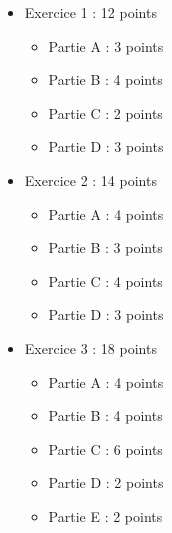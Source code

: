 \documentclass[11pt,a4paper]{article}
\begin{document}
\begin{itemize}[leftmargin=1.8em]
    \item Exercice 1 : 12 points
    \begin{itemize}
        \item Partie A : 3 points
        \item Partie B : 4 points
        \item Partie C : 2 points
        \item Partie D : 3 points
    \end{itemize}
    \item Exercice 2 : 14 points
    \begin{itemize}
        \item Partie A : 4 points
        \item Partie B : 3 points
        \item Partie C : 4 points
        \item Partie D : 3 points
    \end{itemize}
    \item Exercice 3 : 18 points
    \begin{itemize}
        \item Partie A : 4 points
        \item Partie B : 4 points
        \item Partie C : 6 points
        \item Partie D : 2 points
        \item Partie E : 2 points
    \end{itemize}
\end{itemize}
\end{document}
